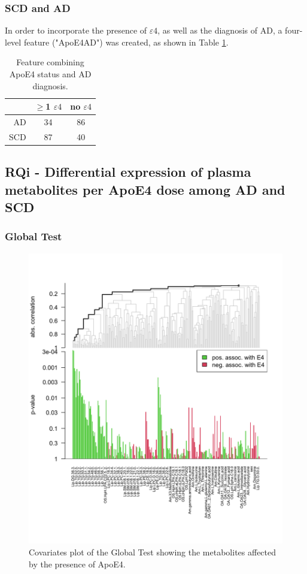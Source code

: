 \documentclass{amsart}
\theoremstyle{plain}
\begin{document}
\subsubsection{SCD and AD}
In order to incorporate the presence of $\varepsilon4$, as well as the diagnosis of AD, a four-level feature ("ApoE4AD") was created, as shown in Table \ref{Table:target}.

\begin{table}[!ht]
\caption{Feature combining ApoE4 status and AD diagnosis.} \label{Table:target}
\begin{tabular}{rcc} \toprule
& $\geq$1 $\varepsilon4$ & no $\varepsilon4$\\ \midrule
AD \vline  & 34& 86\\
 SCD \vline & 87& 40\\ \bottomrule 
\end{tabular}
\end{table}
\subsection{RQi - Differential expression of plasma metabolites per ApoE4 dose among AD and SCD}
\subsubsection{Global Test}

\begin{figure}
  \vspace*{-1cm}
    \includegraphics[width=\textwidth]{figures/gt1.png}
      \caption{Covariates plot of the Global Test showing the metabolites affected by the presence of ApoE4.}
    \label{gt1}
  \end{figure}
\end{document}

